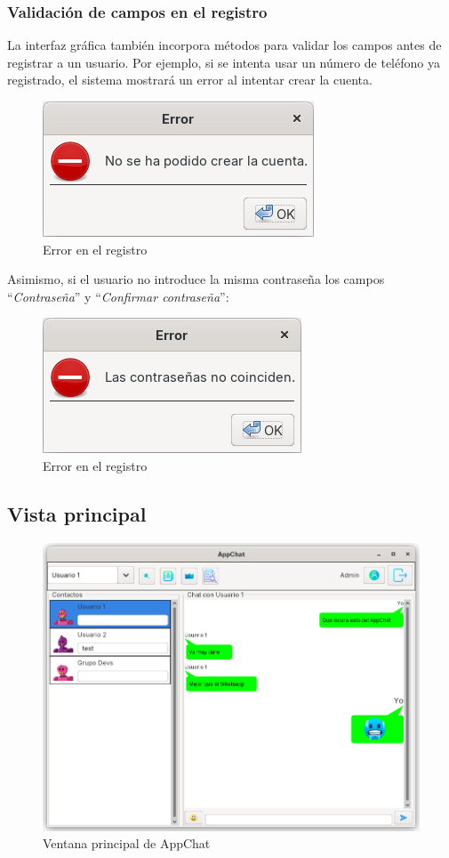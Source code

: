 \documentclass[11pt]{article}
\begin{document}
\subsubsection{Validación de campos en el registro}

La interfaz gráfica también incorpora métodos para validar los campos antes de registrar a un usuario. Por ejemplo, si se intenta usar un número de teléfono ya registrado, el sistema mostrará un error al intentar crear la cuenta.

\begin{figure}[H]
	\centering
	\includegraphics[width=0.35\linewidth]{figures/error-register}
	\caption{Error en el registro}
	\label{fig:error-register}
\end{figure}

Asimismo, si el usuario no introduce la misma contraseña los campos ``\textit{Contraseña}'' y ``\textit{Confirmar contraseña}'':

\begin{figure}[H]
	\centering
	\includegraphics[width=0.35\linewidth]{figures/error-register-passwords}
	\caption{Error en el registro}
	\label{fig:error-register-passwords}
\end{figure}

\subsection{Vista principal}

\begin{figure}[H]
	\centering
	\includegraphics[width=0.75\linewidth]{figures/main}
	\caption{Ventana principal de AppChat}
	\label{fig:main}
\end{figure}
\end{document}
